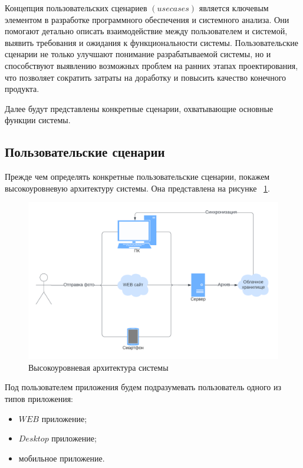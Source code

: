 Концепция пользовательских сценариев $(use cases)$ является ключевым элементом в разработке программного обеспечения и системного анализа. 
Они помогают детально описать взаимодействие между пользователем и системой, выявить требования и ожидания к функциональности системы. 
Пользовательские сценарии не только улучшают понимание разрабатываемой системы, но и способствуют выявлению возможных проблем на ранних этапах проектирования, что позволяет сократить затраты на доработку и повысить качество конечного продукта.

Далее будут представлены конкретные сценарии, охватывающие основные функции системы.
\subsection{Пользовательские сценарии}
Прежде чем определять конкретные пользовательские сценарии, покажем высокоуровневую архитектуру системы. Она представлена на рисунке ~\ref{sys_architecture}.

\begin{figure}
    \includegraphics[scale=0.5]{img/use_cases/architecture.png}
    \caption{Высокоуровневая архитектура системы}
    \label{sys_architecture}
\end{figure}

Под пользователем приложения будем подразумевать пользователь одного из типов приложения:
\begin{itemize}
    \item $WEB$ приложение;
    \item $Desktop$ приложение;
    \item мобильное приложение.
\end{itemize}

